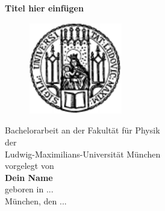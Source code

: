 \thispagestyle{empty}
\begin{center}
\begin{LARGE}
{\bf
\hspace*{1cm} Titel hier einfügen\\ [0.3cm]
}
\end{LARGE}
\vspace{0.5cm}
%
\begin{figure}[htbp]
  \begin{center}
  \hspace*{1cm}
     \includegraphics[height=4cm]{pics/lmu3.pdf}
  \end{center}
\end{figure}

\vspace{1.0cm}
\begin{large}
\hspace*{1cm}Bachelorarbeit an der Fakultät für Physik \\
\hspace*{1cm}der \\
\hspace*{1cm}Ludwig-Maximilians-Universität München \\ [2.5cm]
\hspace*{1cm}vorgelegt von \\
{\bf
\hspace*{1cm}Dein Name     \\ }
\hspace*{1cm}geboren in ... \\ [0.5cm]
\hspace*{1cm}München, den ...
\end{large}
\end{center}

\setcounter{page}{0}

